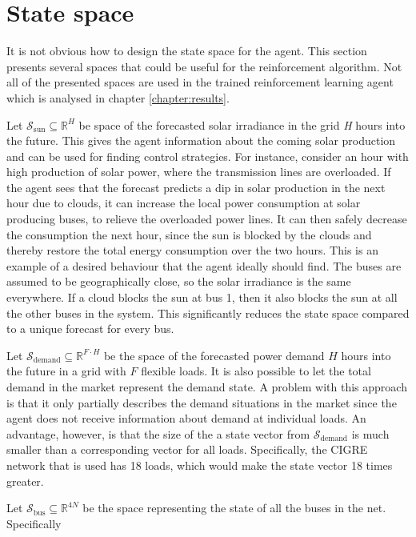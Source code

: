 \documentclass[class=book, crop=false, 11pt]{standalone}
\begin{document}
\section{State space}\label{section:problem:state_space}
It is not obvious how to design the state space for the agent. This section presents several spaces that could be useful for the reinforcement algorithm. Not all of the presented spaces are used in the trained reinforcement learning agent which is analysed in chapter \ref{chapter:results}.

Let $\mathcal{S}_{\textrm{sun}} \subseteq  \mathbb{R}^{H}$ be space of the forecasted solar irradiance in the grid \textit{H} hours into the future. This gives the agent information about the coming solar production and can be used for finding control strategies. For instance, consider an hour with high production of solar power, where the transmission lines are overloaded. If the agent sees that the forecast predicts a dip in solar production in the next hour due to clouds, it can increase the local power consumption at solar producing buses, to relieve the overloaded power lines. It can then safely decrease the consumption the next hour, since the sun is blocked by the clouds and thereby restore the total energy consumption over the two hours. This is an example of a desired behaviour that the agent ideally should find. The buses are assumed to be geographically close, so the solar irradiance is the same everywhere. If a cloud blocks the sun at bus 1, then it also blocks the sun at all the other buses in the system. This significantly reduces the state space compared to a unique forecast for every bus. 

Let $\mathcal{S}_{\textrm{demand}} \subseteq \mathbb{R}^{F\cdot H}$ be the space of the forecasted power demand $H$ hours into the future in a grid with $F$ flexible loads. It is also possible to let the total demand in the market represent the demand state. A problem with this approach is that it only partially describes the demand situations in the market since the agent does not receive information about demand at individual loads. An advantage, however, is that the size of the a state vector from  $\mathcal{S}_{\textrm{demand}}$ is much smaller than a corresponding vector for all loads. Specifically, the CIGRE network that is used has 18 loads, which would make the state vector 18 times greater.


Let $\mathcal{S}_{\textrm{bus}} \subseteq \mathbb{R}^{4N}$ be the space representing the state of all the buses in the net. Specifically
\end{document}
